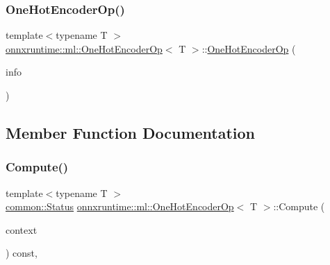 \subsubsection{\texorpdfstring{One\+Hot\+Encoder\+Op()}{OneHotEncoderOp()}}
{\footnotesize\ttfamily template$<$typename T $>$ \\
\mbox{\hyperlink{classonnxruntime_1_1ml_1_1OneHotEncoderOp}{onnxruntime\+::ml\+::\+One\+Hot\+Encoder\+Op}}$<$ T $>$\+::\mbox{\hyperlink{classonnxruntime_1_1ml_1_1OneHotEncoderOp}{One\+Hot\+Encoder\+Op}} (\begin{DoxyParamCaption}\item[{const \mbox{\hyperlink{classonnxruntime_1_1OpKernelInfo}{Op\+Kernel\+Info}} \&}]{info }\end{DoxyParamCaption})\hspace{0.3cm}{\ttfamily [explicit]}}



\subsection{Member Function Documentation}
\mbox{\label{classonnxruntime_1_1ml_1_1OneHotEncoderOp_a20e5ff93c4686bde8713baec7627697c}} 
\subsubsection{\texorpdfstring{Compute()}{Compute()}\hspace{0.1cm}{\footnotesize\ttfamily [1/2]}}
{\footnotesize\ttfamily template$<$typename T $>$ \\
\mbox{\hyperlink{classonnxruntime_1_1common_1_1Status}{common\+::\+Status}} \mbox{\hyperlink{classonnxruntime_1_1ml_1_1OneHotEncoderOp}{onnxruntime\+::ml\+::\+One\+Hot\+Encoder\+Op}}$<$ T $>$\+::Compute (\begin{DoxyParamCaption}\item[{\mbox{\hyperlink{classonnxruntime_1_1OpKernelContext}{Op\+Kernel\+Context}} $\ast$}]{context }\end{DoxyParamCaption}) const\hspace{0.3cm}{\ttfamily [override]}, {\ttfamily [virtual]}}



